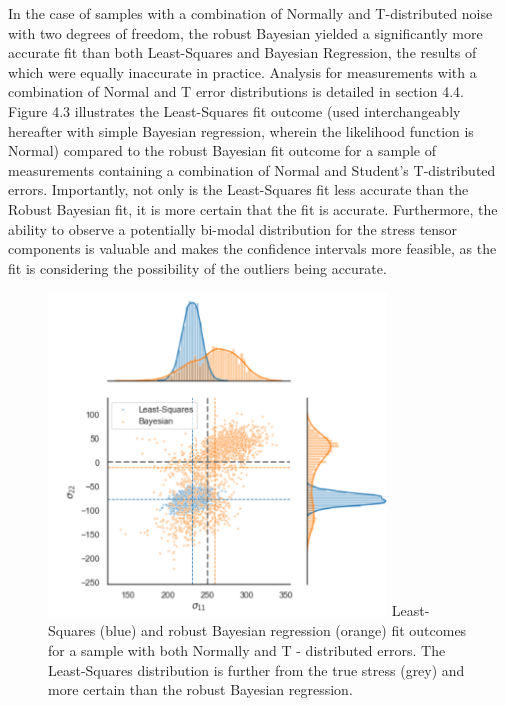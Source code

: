 In the case of samples with a combination of Normally and T-distributed noise with two degrees of freedom, the robust Bayesian yielded a significantly more accurate fit than both Least-Squares and Bayesian Regression, the results of which were equally inaccurate in practice. Analysis for measurements with a combination of Normal and T error distributions is detailed in section 4.4. \\

Figure 4.3 illustrates the Least-Squares fit outcome (used interchangeably hereafter with simple Bayesian regression, wherein the likelihood function is Normal) compared to the robust Bayesian fit outcome for a sample of measurements containing a combination of Normal and Student's T-distributed errors. Importantly, not only is the Least-Squares fit less accurate than the Robust Bayesian fit, it is more certain that the fit is accurate. Furthermore, the ability to observe a potentially bi-modal distribution for the stress tensor components is valuable and makes the confidence intervals more feasible, as the fit is considering the possibility of the outliers being accurate. \\


\begin{figure}[h]
 	\centering
 	\includegraphics[width=0.8\textwidth]{chapters/chapter03/fig03/supervisor.png}
 	\mycaption
 	{Least-Squares (blue) and robust Bayesian regression (orange) fit outcomes for a sample with both Normally and T - distributed errors. The Least-Squares distribution is further from the true stress (grey) and more certain than the robust Bayesian regression.}
    \label{fig:RHP02}
 \end{figure}




